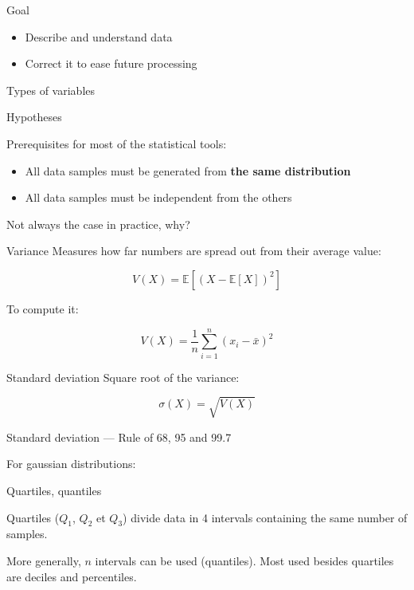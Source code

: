 
\begin{frame}{Goal}
  \begin{itemize}
  \item Describe and understand data
  \item Correct it to ease future processing
  \end{itemize}
\end{frame}

\begin{frame}{Types of variables}
\end{frame}

\begin{frame}{Hypotheses}

  Prerequisites for most of the statistical tools:
  \begin{itemize}
  \item All data samples must be generated from \textbf{the same distribution}
  \item All data samples must be independent from the others
  \end{itemize}
  \alert{Not always the case in practice, why?}
\end{frame}

\begin{frame}{Variance}
  Measures how far numbers are spread out from their average value:

  \[
    V(X) = \mathbb{E}\left[(X - \mathbb{E}[X])^2\right]
  \]

  To compute it:

  \[
    V(X) = \frac{1}{n}\sum_{i = 1}^{n}(x_i - \bar{x})^2
  \]
\end{frame}

\begin{frame}{Standard deviation}
  Square root of the variance:

  \[
    \sigma(X) = \sqrt{V(X)}
  \]

\end{frame}

\begin{frame}{Standard deviation — Rule of 68, 95 and 99.7}

  For gaussian distributions:

\end{frame}

\begin{frame}{Quartiles, quantiles}

  Quartiles ($Q_1$, $Q_2$ et $Q_3$) divide data in 4
  intervals containing the same number of samples.

  More generally, $n$ intervals can be used (quantiles). Most used besides quartiles are deciles and percentiles.
\end{frame}

